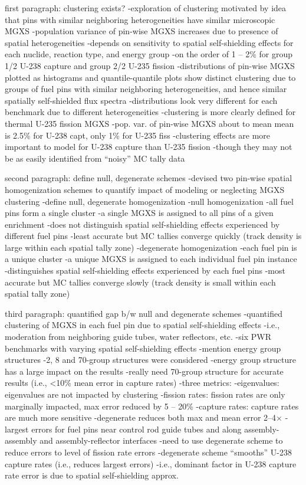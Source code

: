 first paragraph: clustering exists?
-exploration of clustering motivated by idea that pins with similar neighboring heterogeneities have similar microscopic \ac{MGXS}
-population variance of pin-wise \ac{MGXS} increases due to presence of spatial heterogeneities
  -depends on sensitivity to spatial self-shielding effects for each nuclide, reaction type, and energy group
  -on the order of 1 -- 2\% for group 1/2 U-238 capture and group 2/2 U-235 fission
-distributions of pin-wise \ac{MGXS} plotted as histograms and quantile-quantile plots show distinct clustering due to groups of fuel pins with similar neighboring heterogeneities, and hence similar spatially self-shielded flux spectra
  -distributions look very different for each benchmark due to different heterogeneities
  -clustering is more clearly defined for thermal U-235 fission \ac{MGXS}
  -pop. var. of pin-wise \ac{MGXS} about to mean mean is 2.5\% for U-238 capt, only 1\% for U-235 fiss
  -clustering effects are more important to model for U-238 capture than U-235 fission
    -though they may not be as easily identified from ``noisy'' \ac{MC} tally data

second paragraph: define null, degenerate schemes
-devised two pin-wise spatial homogenization schemes to quantify impact of modeling or neglecting \ac{MGXS} clustering
-define null, degenerate homogenization
  -null homogenization
    -all fuel pins form a single cluster
    -a single \ac{MGXS} is assigned to all pins of a given enrichment
    -does not distinguish spatial self-shielding effects experienced by different fuel pins
    -least accurate but MC tallies converge quickly (track density is large within each spatial tally zone)
  -degenerate homogenization
    -each fuel pin is a unique cluster
    -a unique \ac{MGXS} is assigned to each individual fuel pin instance
    -distinguishes spatial self-shielding effects experienced by each fuel pins
    -most accurate but MC tallies converge slowly (track density is small within each spatial tally zone)

third paragraph: quantified gap b/w null and degenerate schemes
-quantified clustering of \ac{MGXS} in each fuel pin due to spatial self-shielding effects
  -i.e., moderation from neighboring guide tubes, water reflectors, etc.
-six \ac{PWR} benchmarks with varying spatial self-shielding effects
-mention energy group structures
  -2, 8 and 70-group structures were considered
  -energy group structure has a large impact on the results
  -really need 70-group structure for accurate results (i.e., <10\% mean error in capture rates) 
-three metrics:
  -eigenvalues: eigenvalues are not impacted by clustering
  -fission rates: fission rates are only marginally impacted, max error reduced by 5 -- 20\%
  -capture rates: capture rates are much more sensitive
    -degenerate reduces both max and mean error 2--4$\times$
    -largest errors for fuel pins near control rod guide tubes and along assembly-assembly and assembly-reflector interfaces
    -need to use degenerate scheme to reduce errors to level of fission rate errors
    -degenerate scheme ``smooths'' U-238 capture rates (i.e., reduces largest errors)
    -i.e., dominant factor in U-238 capture rate error is due to spatial self-shielding approx.

